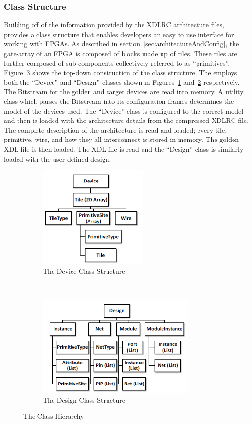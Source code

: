 \subsubsection{Class Structure} \label{sec:classStructure}
Building off of the information provided by the XDLRC architecture files, \RapidSmith provides a class structure that enables developers an easy to use interface for working with \acrshort{FPGA}s.
As described in section~\ref{sec:architectureAndConfig}, the gate-array of an \acrshort{FPGA} is composed of blocks made up of tiles.
These tiles are further composed of sub-components collectively referred to as ``primitives''.
Figure~\ref{fig:classStructures} shows the top-down construction of the \RapidSmith class structure.
The \NameNoPeriod employs both the ``Device'' and ``Design'' classes shown in Figures~\ref{fig:rapidSmithDevice} and~\ref{fig:rapidSmithDesign} respectively.
The \gls{Bitstream} for the \gls{golden} and \gls{target} devices are read into memory. 
A utility class which parses the \gls{Bitstream} into its configuration frames determines the model of the devices used.
The ``Device'' class is configured to the correct model and then is loaded with the architecture details from the compressed XDLRC file.
The complete description of the architecture is read and loaded; every tile, primitive, wire, and how they all interconnect is stored in memory.
The \gls{golden} \acrshort{XDL} file is then loaded.
The \acrshort{XDL} file is read and the ``Design'' class is similarly loaded with the user-defined design.
\begin{figure}[h]
	\centering
	\begin{subfigure}[t]{0.5\textwidth}
		\centering
		\includegraphics[height=2in]{Figures/rapidSmithDevice}
		\caption{The Device Class-Structure}
		\label{fig:rapidSmithDevice}
	\end{subfigure}%
	~ 
	\begin{subfigure}[t]{0.5\textwidth}
		\centering
		\includegraphics[height=2in]{Figures/rapidSmithDesign}
		\caption{The Design Class-Structure}
		\label{fig:rapidSmithDesign}
	\end{subfigure}
	\caption{The \RapidSmith Class Hierarchy~\cite{rapidSmithManual}}
	\label{fig:classStructures}
\end{figure}

